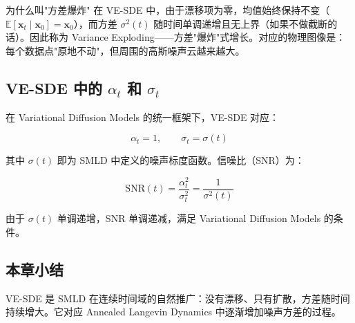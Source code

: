 \begin{knowledgebox}{为什么叫"方差爆炸"}
在 VE-SDE 中，由于漂移项为零，均值始终保持不变（$\mathbb{E}[\mathbf{x}_t \mid \mathbf{x}_0] = \mathbf{x}_0$），而方差 $\sigma^2(t)$ 随时间单调递增且无上界（如果不做截断的话）。因此称为 Variance Exploding——方差"爆炸"式增长。对应的物理图像是：每个数据点"原地不动"，但周围的高斯噪声云越来越大。
\end{knowledgebox}

\subsection{VE-SDE 中的 $\alpha_t$ 和 $\sigma_t$}

在 Variational Diffusion Models 的统一框架下，VE-SDE 对应：

$$
\alpha_t = 1, \qquad \sigma_t = \sigma(t)
$$

其中 $\sigma(t)$ 即为 SMLD 中定义的噪声标度函数。信噪比（SNR）为：

$$
\mathrm{SNR}(t) = \frac{\alpha_t^2}{\sigma_t^2} = \frac{1}{\sigma^2(t)}
$$

由于 $\sigma(t)$ 单调递增，SNR 单调递减，满足 Variational Diffusion Models 的条件。

\subsection{本章小结}

VE-SDE 是 SMLD 在连续时间域的自然推广：没有漂移、只有扩散，方差随时间持续增大。它对应 Annealed Langevin Dynamics 中逐渐增加噪声方差的过程。


